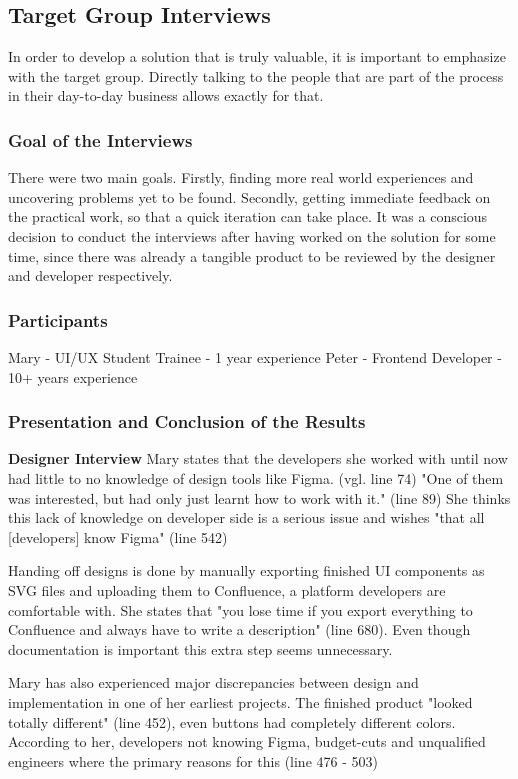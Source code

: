\newpage
\subsection{Target Group Interviews}
In order to develop a solution that is truly valuable, it is important to emphasize with the target
group. Directly talking to the people that are part of the process in their day-to-day business
allows exactly for that.

\subsubsection{Goal of the Interviews}
There were two main goals. Firstly, finding more real world experiences and uncovering problems yet
to be found. Secondly, getting immediate feedback on the practical work, so that a quick iteration
can take place. It was a conscious decision to conduct the interviews after having worked on the
solution for some time, since there was already a tangible product to be reviewed by the designer
and developer respectively.

\subsubsection{Participants}
Mary -  UI/UX Student Trainee - 1 year experience
Peter - Frontend Developer - 10+ years experience


\subsubsection{Presentation and Conclusion of the Results}
\textbf{Designer Interview}
Mary states that the developers she worked with until now had little to no knowledge of design tools
like Figma. (vgl. line 74) "One of them was interested, but had only just learnt how to work with
it." (line 89) She thinks this lack of knowledge on developer side is a serious issue and wishes
"that all [developers] know Figma" (line 542)

Handing off designs is done by manually exporting finished UI components as SVG files and
uploading them to Confluence, a platform developers are comfortable with. She states that "you lose
time if you export everything to Confluence and always have to write a description" (line 680). Even 
though documentation is important this extra step seems unnecessary.

Mary has also experienced major discrepancies between design and implementation in one of her
earliest projects. The finished product "looked totally different" (line 452), even buttons had
completely different colors. According to her, developers not knowing Figma, budget-cuts and
unqualified engineers where the primary reasons for this (line 476 - 503)

